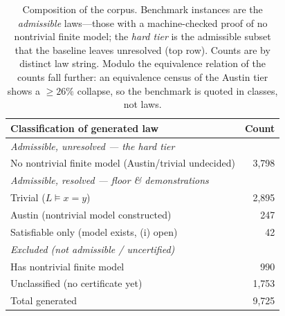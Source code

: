 %
%


\begin{table}[t]
\centering
\small
\begin{tabular}{lr}
\toprule
Classification of generated law & Count \\
\midrule
\multicolumn{2}{l}{\emph{Admissible, unresolved --- the hard tier}} \\
\quad No nontrivial finite model (Austin/trivial undecided) & 3{,}798 \\
\midrule
\multicolumn{2}{l}{\emph{Admissible, resolved --- floor \& demonstrations}} \\
\quad Trivial ($L \models x{=}y$)            & 2{,}895 \\
\quad Austin (nontrivial model constructed)  & 247 \\
\quad Satisfiable only (model exists, (i) open) & 42 \\
\midrule
\multicolumn{2}{l}{\emph{Excluded (not admissible / uncertified)}} \\
\quad Has nontrivial finite model            & 990 \\
\quad Unclassified (no certificate yet)      & 1{,}753 \\
\midrule
Total generated                              & 9{,}725 \\
\bottomrule
\end{tabular}
\caption{Composition of the corpus. Benchmark instances are the \emph{admissible}
laws---those with a machine-checked proof of no nontrivial finite model; the
\emph{hard tier} is the admissible subset that the baseline leaves unresolved
(top row). Counts are by distinct law string. Modulo the equivalence relation of
 the counts fall further: an equivalence census of the Austin tier
shows a $\geq 26\%$ collapse, so the benchmark is quoted in classes, not laws.
}
\label{tab:corpus}
\end{table}


